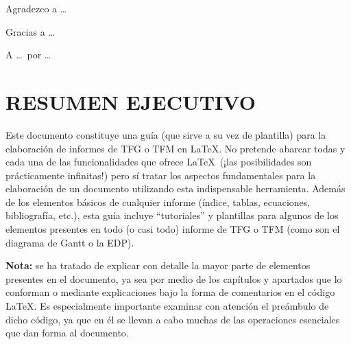 \documentclass[a4paper, 11pt, spanish, twoside]{article}
\newcommand\blankpage{%
    \null
    \thispagestyle{empty}%
    \newpage}
\begin{document}
Agradezco a \dots

Gracias a \dots

A \dots \ por \dots

\afterpage{\blankpage} %




\newpage
\section*{RESUMEN EJECUTIVO} %

Este documento constituye una guía (que sirve a su vez de plantilla) para la elaboración de informes de TFG o TFM en \LaTeX. No pretende abarcar todas y cada una de las funcionalidades que ofrece \LaTeX \ (¡las posibilidades son prácticamente infinitas!) pero sí tratar los aspectos fundamentales para la elaboración de un documento utilizando esta indispensable herramienta. Además de los elementos básicos de cualquier informe (índice, tablas, ecuaciones, bibliografía, etc.), esta guía incluye ``tutoriales'' y plantillas para algunos de los elementos presentes en todo (o casi todo) informe de TFG o TFM (como son el diagrama de Gantt o la EDP). 

\textbf{Nota:} se ha tratado de explicar con detalle la mayor parte de elementos presentes en el documento, ya sea por medio de los capítulos y apartados que lo conforman o mediante explicaciones bajo la forma de comentarios en el código \LaTeX. Es especialmente importante examinar con atención el preámbulo de dicho código, ya que en él se llevan a cabo muchas de las operaciones esenciales que dan forma al documento.
\end{document}
